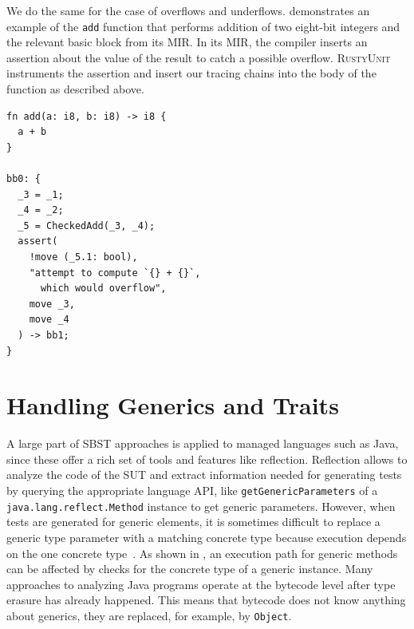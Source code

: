 \documentclass[paper=a4,%
  twoside,%
  BCOR4mm,%
  abstract=true,%
  toc=bibliography,%
  chapterprefix=true,%
  toc=bibliographynumbered,%
  open=right,%
  english,%
  pagesize=pdftex]{scrreprt}
\newcommand{\tech}{\textsc{RustyUnit}\xspace}
\newcommand{\mir}{\ac{MIR}\xspace}
\newcommand{\sut}{\ac{SUT}\xspace}
\begin{document}
We do the same for the case of overflows and underflows.  demonstrates an example of the \texttt{add} function that performs addition of two eight-bit integers and the relevant basic block from its \mir. In its \mir, the compiler inserts an assertion about the value of the result to catch a possible overflow. \tech instruments the assertion and insert our tracing chains into the body of the function as described above.
\begin{lstlisting}[language={}, style=boxed, caption={\mir overflow check created by the compiler}, label=lst:mir-overflow-check]
fn add(a: i8, b: i8) -> i8 {
  a + b
}

bb0: {
  _3 = _1;
  _4 = _2;
  _5 = CheckedAdd(_3, _4);
  assert(
    !move (_5.1: bool),
    "attempt to compute `{} + {}`,
      which would overflow",
    move _3,
    move _4
  ) -> bb1;
}
\end{lstlisting}





\section{Handling Generics and Traits}
A large part of \ac{SBST} approaches is applied to managed languages such as Java, since these offer a rich set of tools and features like reflection. Reflection allows to analyze the code of the \sut and extract information needed for generating tests by querying the appropriate language \ac{API}, like \texttt{getGenericParameters} of a \texttt{java.lang.reflect.Method} instance to get generic parameters. However, when tests are generated for generic elements, it is sometimes difficult to replace a generic type parameter with a matching concrete type because execution depends on the one concrete type~\cite{Fraser2014b}. As shown in , an execution path for generic methods can be affected by checks for the concrete type of a generic instance. Many approaches to analyzing Java programs operate at the bytecode level after type erasure has already happened. This means that bytecode does not know anything about generics, they are replaced, for example, by \texttt{Object}. 
\end{document}
